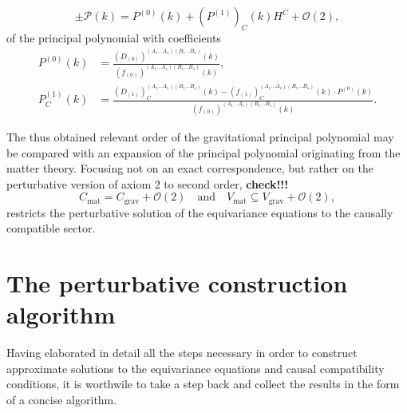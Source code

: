 \begin{equation}
  \pm \mathcal P(k) = P^{(0)}(k) + (P^{(1)})_C(k) H^C + \mathcal O(2),
\end{equation}
of the principal polynomial with coefficients
\begin{equation}\label{expansion_coefficients_poly}
  \begin{aligned}
    P^{(0)}(k) &{} = \frac{(D_{(0)})^{(A_1\dots A_s)(B_1\dots B_s)}(k)}{(f_{(0)})^{(A_1\dots A_s)(B_1\dots B_s)}(k)}, \\
    P^{(1)}_C(k) &{} = \frac{(D_{(1)})^{(A_1\dots A_s)(B_1\dots B_s)}_C(k) - (f_{(1)})^{(A_1\dots A_s)(B_1\dots B_s)}_C(k) \cdot P^{(0)}(k)}{(f_{(0)})^{(A_1\dots A_s)(B_1\dots B_s)}(k)}.
  \end{aligned}
\end{equation}

The thus obtained relevant order of the gravitational principal polynomial may be compared with an expansion of the principal polynomial originating from the matter theory. Focusing not on an exact correspondence, but rather on the perturbative version of axiom 2 to second order, \textbf{check!!!}
\begin{equation}
  C_\text{mat} = C_\text{grav} + \mathcal O(2) \quad\text{and}\quad V_\text{mat} \subseteq V_\text{grav} + \mathcal O(2),
\end{equation}
restricts the perturbative solution of the equivariance equations to the causally compatible sector.

\section{The perturbative construction algorithm}

Having elaborated in detail all the steps necessary in order to construct approximate solutions to the equivariance equations and causal compatibility conditions, it is worthwile to take a step back and collect the results in the form of a concise algorithm.

